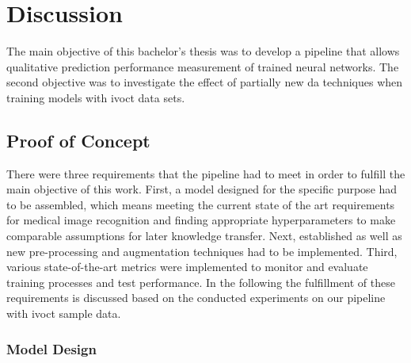 
\chapter{Discussion}

The main objective of this bachelor’s thesis was to develop a pipeline that allows qualitative prediction performance measurement of trained neural networks. The second objective was to investigate the effect of partially new \acrshort{da} techniques when training models with \acrshort{ivoct} data sets.

\section{Proof of Concept}

There were three requirements that the pipeline had to meet in order to fulfill the main objective of this work. First, a model designed for the specific purpose had to be assembled, which means meeting the current state of the art requirements for medical image recognition and finding appropriate hyperparameters to make comparable assumptions for later knowledge transfer. Next, established as well as new pre-processing and augmentation techniques had to be implemented. Third, various state-of-the-art metrics were implemented to monitor and evaluate training processes and test performance. In the following the fulfillment of these requirements is discussed based on the conducted experiments on our pipeline with \acrshort{ivoct} sample data.

\subsection{Model Design}

